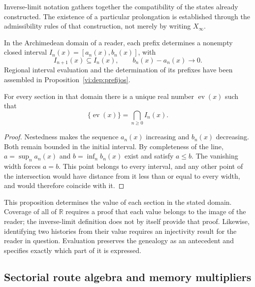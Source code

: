 Inverse-limit notation gathers together the compatibility of the states already
constructed. The existence of a particular prolongation is established
through the admissibility rules of that construction, not merely by
writing \(X_\infty\).

In the Archimedean domain of a reader, each prefix determines a
nonempty closed interval \(I_n(x)=[a_n(x),b_n(x)]\), with
\begin{equation}
 I_{n+1}(x)\subseteq I_n(x),\qquad
 b_n(x)-a_n(x)\longrightarrow0.
 \label{vi:hist:cilindros}
\end{equation}
Regional interval evaluation and the determination of its prefixes
have been assembled in Proposition~\ref{vi:dep:prefijos}.

\begin{proposition}
For every section in that domain there is a unique real number
\(\operatorname{ev}(x)\) such that
\begin{equation}
 \{\operatorname{ev}(x)\}=\bigcap_{n\ge0}I_n(x).
 \label{vi:hist:evaluacion}
\end{equation}
\end{proposition}
\begin{proof}
Nestedness makes the sequence \(a_n(x)\) increasing and
\(b_n(x)\) decreasing. Both remain bounded in the initial interval. By
completeness of the line, \(a=\sup_n a_n(x)\) and
\(b=\inf_n b_n(x)\) exist and satisfy \(a\le b\).
The vanishing width forces \(a=b\). This point belongs to every
interval, and any other point of the intersection would have distance from
it less than or equal to every width, and would therefore coincide with it.
\end{proof}

This proposition determines the value of each section in the stated domain.
Coverage of all of \(\mathbb R\) requires a proof that each value
belongs to the image of the reader; the inverse-limit definition does not
by itself provide that proof. Likewise, identifying two
histories from their value requires an injectivity result
for the reader in question. Evaluation preserves the genealogy as
an antecedent and specifies exactly which part of it is expressed.

\subsection{Sectorial route algebra and memory multipliers}
\label{vi:hist:algebra}

